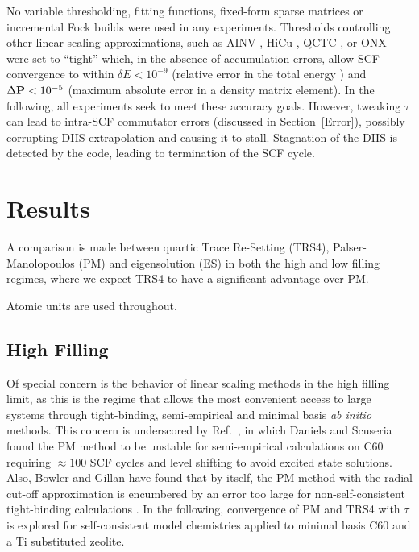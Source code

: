 \commentoutA{\documentclass[prb,aps,twocolumn,showpacs,twocolumngrid,superbib]{revtex4}}
\begin{document}
No variable thresholding, fitting functions, fixed-form sparse matrices or incremental Fock builds were used in 
any experiments.  Thresholds controlling other linear scaling approximations, such as 
AINV \cite{MChallacombe99,MChallacombe03B,MBenzi01}, 
HiCu \cite{MChallacombe00A,CGan03},  
QCTC \cite{MChallacombe96,MChallacombe96B,MChallacombe97,MChallacombe03A}, or
ONX \cite{ESchwegler96,ESchwegler97,ESchwegler98A,ESchwegler98C,ESchwegler99,ESchwegler00}
were set to ``tight''  which, in the absence of accumulation errors, allow SCF convergence to within 
$\delta E < 10^{-9}$ (relative error in the total energy ) and 
$\Delta{\bf P} < 10^{-5}$ (maximum absolute error in a density matrix element). In the following, all 
experiments seek to meet these accuracy goals.  However, tweaking $\tau$  can lead to intra-SCF commutator 
errors (discussed in Section~\ref{Error}), possibly corrupting DIIS extrapolation \cite{PPulay80,PPulay82} and 
causing it to stall.  Stagnation of the DIIS is detected by the code, leading to termination of the SCF cycle.

\section{Results}\label{results}

A comparison is made between quartic Trace Re-Setting (TRS4), Palser-Manolopoulos \cite{APalser98}  
(PM) and eigensolution (ES) in both the high and low filling regimes, where we expect 
TRS4 to have a significant advantage over PM.

\smallskip
Atomic units are used throughout. 

\subsection{High Filling}

Of special concern is the behavior of linear scaling methods in the high filling limit,
as this is the regime that allows the most convenient access to large systems through
tight-binding, semi-empirical and minimal basis {\em ab initio} methods.
This concern is underscored by Ref.~, in which Daniels and Scuseria 
found the PM method to be unstable for semi-empirical calculations on C60 requiring  
$\approx 100$ SCF cycles and level shifting to avoid excited state solutions.
Also, Bowler and Gillan have found that by itself, the PM method with the radial cut-off approximation 
is encumbered by an error too large for non-self-consistent tight-binding calculations \cite{DBowler99}.  
In the following,  convergence of PM and TRS4 with $\tau$ is explored for self-consistent model 
chemistries applied to minimal basis C60 and a Ti substituted zeolite.
\end{document}
